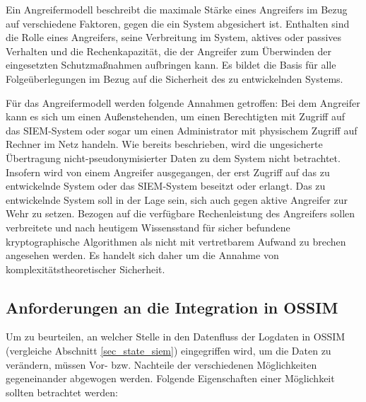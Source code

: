 Ein Angreifermodell beschreibt die maximale Stärke eines Angreifers im Bezug auf verschiedene Faktoren, gegen die ein System abgesichert ist. Enthalten sind die Rolle eines Angreifers, seine Verbreitung im System, aktives oder passives Verhalten und die Rechenkapazität, die der Angreifer zum Überwinden der eingesetzten Schutzmaßnahmen aufbringen kann. Es bildet die Basis für alle Folgeüberlegungen im Bezug auf die Sicherheit des zu entwickelnden Systems.

Für das Angreifermodell werden folgende Annahmen getroffen: Bei dem Angreifer kann es sich um einen Außenstehenden, um einen Berechtigten mit Zugriff auf das SIEM-System oder sogar um einen Administrator mit physischem Zugriff auf Rechner im Netz handeln. Wie bereits beschrieben, wird die ungesicherte Übertragung nicht-pseudonymisierter Daten zu dem System nicht betrachtet. Insofern wird von einem Angreifer ausgegangen, der erst Zugriff auf das zu entwickelnde System oder das SIEM-System beseitzt oder erlangt. Das zu entwickelnde System soll in der Lage sein, sich auch gegen aktive Angreifer zur Wehr zu setzen. 
Bezogen auf die verfügbare Rechenleistung des Angreifers sollen verbreitete und nach heutigem Wissensstand für sicher befundene kryptographische Algorithmen als nicht mit vertretbarem Aufwand zu brechen angesehen werden. Es handelt sich daher um die Annahme von komplexitätstheoretischer Sicherheit.


\subsection*{Anforderungen an die Integration in OSSIM}

\label{sec_requirements_ossim_integration}

Um zu beurteilen, an welcher Stelle in den Datenfluss der Logdaten in OSSIM (vergleiche Abschnitt \ref{sec_state_siem}) eingegriffen wird, um die Daten zu verändern, müssen Vor- bzw. Nachteile der verschiedenen Möglichkeiten gegeneinander abgewogen werden. Folgende Eigenschaften einer Möglichkeit sollten betrachtet werden:

